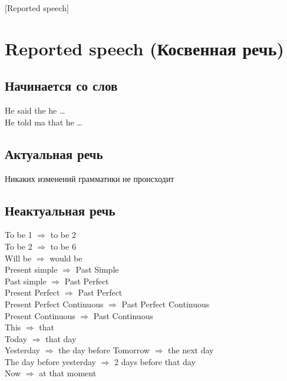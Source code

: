 [Reported speech]

\section{Reported speech (Косвенная речь)}
\subsection{Начинается со слов}
\p
He said the he \dots \\
He told ma that he \dots \\

\subsection{Актуальная речь}
\p
Никаких изменений грамматики не происходит \\

\subsection{Неактуальная речь}
\p
To be 1 $\Rightarrow$ to be 2\\
To be 2 $\Rightarrow$ to be 6\\
Will be $\Rightarrow$ would be\\
Present simple $\Rightarrow$ Past Simple\\
Past simple $\Rightarrow$ Past Perfect\\
Present Perfect $\Rightarrow$ Past Perfect\\
Present Perfect Continuous $\Rightarrow$ Past Perfect Continuous\\
Present Continuous $\Rightarrow$ Past Continuous\\
This $\Rightarrow$ that\\
Today $\Rightarrow$ that day\\
Yesterday $\Rightarrow$ the day before
Tomorrow $\Rightarrow$ the next day\\
The day before yesterday $\Rightarrow$ 2 days before that day\\
Now $\Rightarrow$ at that moment

